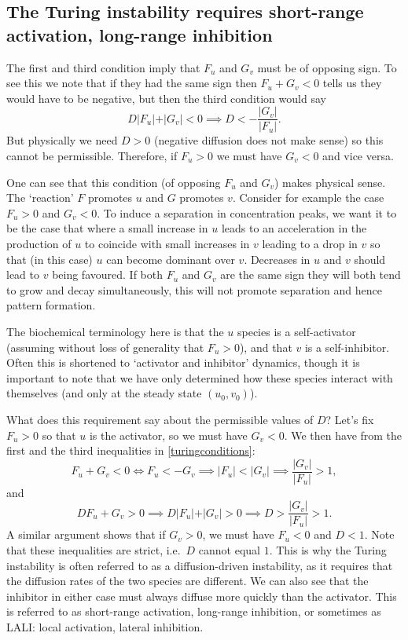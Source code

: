 \documentclass[main.tex]{subfiles}
\begin{document}
\subsection{The Turing instability requires short-range activation, long-range inhibition}

The first and third condition imply that $F_u$ and $G_v$ must be of opposing sign. To see this we note that if they had the same sign then $F_u + G_v<0$ tells us they would have to be negative, but then the third condition would say
\begin{equation}
D \vert F_u \vert + \vert G_v\vert < 0 \implies D <-\frac{\vert G_v\vert}{\vert F_u\vert}.
\end{equation} 
But physically we need $D>0$ (negative diffusion does not make sense) so this cannot be permissible. Therefore, if $F_u>0$ we must have $G_v<0$ and vice versa.

One can see that this condition (of opposing $F_u$ and $G_v$) makes physical sense. The `reaction' $F$ promotes $u$ and $G$ promotes $v$. Consider for example the case $F_u>0$ and $G_v<0$. To induce a separation in concentration peaks, we want it to be the case that where a small increase in  $u$  leads to an acceleration in the production of $u$ to coincide with small increases in $v$ leading to a drop in $v$ so that (in this case) $u$ can become dominant over $v$. Decreases in $u$ and $v$ should lead to $v$ being favoured. If both  $F_u$ and $G_v$ are the same sign they will both tend to grow and decay simultaneously, this will not promote separation and hence pattern formation. 

The biochemical terminology here is that the $u$ species is a self-activator (assuming without loss of generality that $F_u>0$), and that $v$ is a self-inhibitor. Often this is shortened to `activator and inhibitor' dynamics, though it is important to note that we have only determined how these species interact with themselves (and only at the steady state $(u_0,v_0)$).

What does this requirement say about the permissible values of $D$? Let's fix $F_u>0$ so that $u$ is the activator, so we must have $G_v<0$.  We then have from the first and the third inequalities in \cref{turingconditions}:
\begin{equation}
    F_u + G_v<0 \iff F_u < -G_v \implies \vert F_u \vert < \vert G_v \vert \implies \frac{\vert G_v\vert }{\vert F_u \vert} >1,
\end{equation}
and 
\begin{equation}
DF_u+G_v > 0 \implies D\vert F_u\vert +\vert G_v\vert >0 \implies D>\frac{\vert G_v\vert }{\vert F_u \vert} >1.
\end{equation} 
  A similar argument shows that if $G_v>0$, we must have $F_u<0$ and $D<1$. Note that these inequalities are strict, i.e.\ $D$ cannot equal $1$. This is why the Turing instability is often referred to as a diffusion-driven instability, as it requires that the diffusion rates of the two species are different. We can also see that the inhibitor in either case must always diffuse more quickly than the activator. This is referred to as short-range activation, long-range inhibition, or sometimes as LALI: local activation, lateral inhibition. 
 
\end{document}
